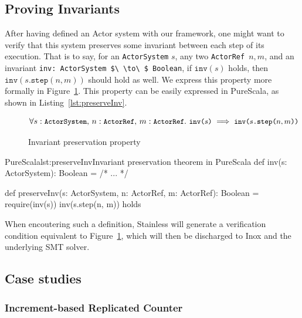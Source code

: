 \documentclass[a4paper,twoside]{article}
\newcommand{\InlineS}[1]{\lstinline[language=PureScala,basicstyle=\small\ttfamily,columns=fixed]|#1|}
\newcommand{\TODO}[1]{\textcolor{YellowOrange}{(TODO)}} %
\newcommand{\RefFig}[1]{Figure~\ref{#1}}
\newcommand{\RefCode}[1]{Listing~\ref{#1}}
\newcommand{\ActorRef}{\InlineS{ActorRef}\ }
\newcommand{\stt}[1]{\texttt{\small{#1}}}
\begin{document}
\subsection{Proving Invariants}
\label{invariants}

After having defined an Actor system with our framework, one might want to verify that this 
system preserves some invariant between each step of its execution. That is to say, 
for an \InlineS{ActorSystem} $s$, any two \ActorRef $n, m$,
and an invariant \InlineS{inv: ActorSystem $\ \to\ $ Boolean}, if $\texttt{inv}(s)$ holds, 
then $\texttt{inv}(s\texttt{.step}(n, m))$ should hold as well. We express this 
property more formally in \RefFig{fig:stepinvariant}. This property can be easily expressed in PureScala, as shown in \RefCode{lst:preserveInv}.

\begin{figure}[!h]
$$\forall s: \stt{ActorSystem},\, n: \stt{ActorRef},\, m: \stt{ActorRef}.\ \stt{inv($s$)} \implies \stt{inv($s$.step($n, m$))}$$
\vspace{-20pt}
\caption{Invariant preservation property\label{fig:stepinvariant}}
\end{figure}

\begin{Code}{PureScala}{lst:preserveInv}{Invariant preservation theorem in PureScala}
def inv(s: ActorSystem): Boolean = {
  /* ... */
}

def preserveInv(s: ActorSystem, n: ActorRef, m: ActorRef): Boolean = {
  require(inv(s))
  inv(s.step(n, m))
} holds
\end{Code}

When encoutering such a definition, Stainless will generate a verification condition 
equivalent to \RefFig{fig:stepinvariant}, which will then be discharged to Inox and the underlying SMT solver.

%

\subsection{Case studies}
\label{casestudies}

\subsubsection{Increment-based Replicated Counter}
\label{repcounterinc}
\end{document}
